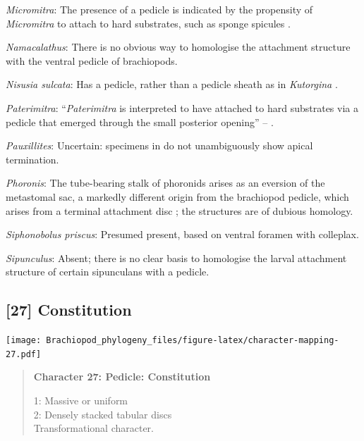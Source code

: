 \documentclass[openany]{book}
\begin{document}
\hypertarget{Micromitra-coding-26}{}
\emph{Micromitra}: The presence of a pedicle is indicated by the
propensity of \emph{Micromitra} to attach to hard substrates, such as
sponge spicules \citep{Holmer2006Aspinose}.

\hypertarget{Namacalathus-coding-26}{}
\emph{Namacalathus}: There is no obvious way to homologise the
attachment structure with the ventral pedicle of brachiopods.

\hypertarget{Nisusia_sulcata-coding-26}{}
\emph{Nisusia sulcata}: Has a pedicle, rather than a pedicle sheath as
in \emph{Kutorgina}
\citep{Holmer2018Evolutionarysignificance, Holmer2018Theattachment}.

\hypertarget{Paterimitra-coding-26}{}
\emph{Paterimitra}: ``\emph{Paterimitra} is interpreted to have attached
to hard substrates via a pedicle that emerged through the small
posterior opening'' -- \citet{Skovsted2009Thescleritome}.

\hypertarget{Pauxillites-coding-26}{}
\emph{Pauxillites}: Uncertain: specimens in \citet{Valent2015} do not
unambiguously show apical termination.

\hypertarget{Phoronis-coding-26}{}
\emph{Phoronis}: The tube-bearing stalk of phoronids arises as an
eversion of the metastomal sac, a markedly different origin from the
brachiopod pedicle, which arises from a terminal attachment disc
\citep{Young2002}; the structures are of dubious homology.

\hypertarget{Siphonobolus_priscus-coding-26}{}
\emph{Siphonobolus priscus}: Presumed present, based on ventral foramen
with colleplax.

\hypertarget{Sipunculus-coding-26}{}
\emph{Sipunculus}: Absent; there is no clear basis to homologise the
larval attachment structure of certain sipunculans with a pedicle.

\subsection*{{[}27{]} Constitution}\label{constitution-1}

\texttt{[image: Brachiopod\_phylogeny\_files/figure-latex/character-mapping-27.pdf]}

\begin{quote}
\textbf{Character 27: Pedicle: Constitution}

1: Massive or uniform\\
2: Densely stacked tabular discs\\
Transformational character.
\end{quote}
\end{document}

